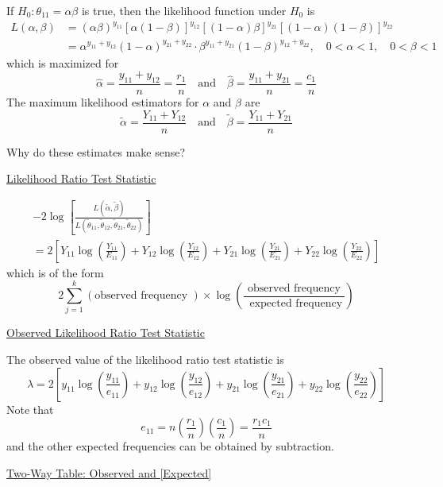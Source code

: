 If $H_{0}: \theta_{11}=\alpha \beta$ is true, then the likelihood function under $H_{0}$ is
\[
    \begin{aligned}
        L(\alpha, \beta) & =(\alpha \beta)^{y_{11}}[\alpha(1-\beta)]^{y_{12}}[(1-\alpha) \beta]^{y_{21}}[(1-\alpha)(1-\beta)]^{y_{22}}                               \\
                         & =\alpha^{y_{11}+y_{12}}(1-\alpha)^{y_{21}+y_{22}} \cdot \beta^{y_{11}+y_{21}}(1-\beta)^{y_{12}+y_{22}}, \quad 0<\alpha<1, \quad 0<\beta<1
    \end{aligned}
\]
which is maximized for
\[
    \hat{\alpha}=\frac{y_{11}+y_{12}}{n}=\frac{r_{1}}{n} \quad \text{and} \quad \hat{\beta}=\frac{y_{11}+y_{21}}{n}=\frac{c_{1}}{n}
\]
The maximum likelihood estimators for $\alpha$ and $\beta$ are
\[
    \tilde{\alpha}=\frac{Y_{11}+Y_{12}}{n} \quad \text{and} \quad \tilde{\beta}=\frac{Y_{11}+Y_{21}}{n}
\]

Why do these estimates make sense?

\underline{Likelihood Ratio Test Statistic}

\[
    \begin{array}{c}
        -2 \log \left[\frac{L(\tilde{\alpha}, \tilde{\beta})}{L\left(\tilde{\theta}_{11}, \tilde{\theta}_{12}, \tilde{\theta}_{21}, \tilde{\theta}_{22}\right)}\right] \\
        =2\left[Y_{11} \log \left(\frac{Y_{11}}{E_{11}}\right)+Y_{12} \log \left(\frac{Y_{12}}{E_{12}}\right)+Y_{21} \log \left(\frac{Y_{21}}{E_{21}}\right)+Y_{22} \log \left(\frac{Y_{22}}{E_{22}}\right)\right]
    \end{array}
\]
which is of the form
\[
    2 \sum_{j=1}^{k}(\text{observed frequency }) \times \log \left(\frac{\text{ observed frequency }}{\text{ expected frequency}}\right)
\]

\underline{Observed Likelihood Ratio Test Statistic}

The observed value of the likelihood ratio test statistic is
\[
    \lambda=2\left[y_{11} \log \left(\frac{y_{11}}{e_{11}}\right)+y_{12} \log \left(\frac{y_{12}}{e_{12}}\right)+y_{21} \log \left(\frac{y_{21}}{e_{21}}\right)+y_{22} \log \left(\frac{y_{22}}{e_{22}}\right)\right]
\]
Note that
\[
    e_{11}=n\left(\frac{r_{1}}{n}\right)\left(\frac{c_{1}}{n}\right)=\frac{r_{1} c_{1}}{n}
\]
and the other expected frequencies can be obtained by subtraction.

\underline{Two-Way Table: Observed and [Expected]}

